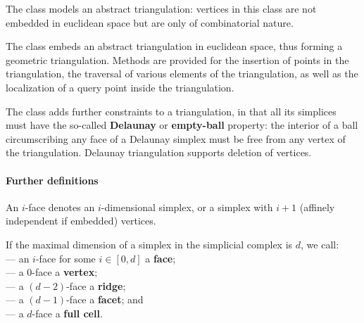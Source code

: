 {{The class  models an abstract triangulation: vertices in this
class are not embedded in euclidean space but are only of combinatorial
nature.

The class  embeds an abstract
triangulation in euclidean space, thus forming a geometric
triangulation. Methods are
provided for the insertion %
of points in the triangulation, the
traversal of various elements of the triangulation, as well as the localization of a
query point inside the triangulation.

The class  adds further
constraints to a triangulation, in that all its simplices must have the
so-called \textbf{Delaunay} or \textbf{empty-ball} property: the interior of
a ball circumscribing any face of a Delaunay simplex must be free from any
vertex of the triangulation. Delaunay triangulation supports deletion
of vertices.



\paragraph{Further definitions}

An $i$-face denotes an $i$-dimensional simplex, or a simplex
with $i+1$ (affinely independent if embedded) vertices.

If the maximal dimension of a simplex in the simplicial complex is
$d$, we call:\\
--- an $i$-face for some $i\in[0,d]$ a  \textbf{face};\\
--- a $0$-face a \textbf{vertex};\\
--- a $(d-2)$-face a \textbf{ridge};\\
--- a $(d-1)$-face a \textbf{facet}; and\\
--- a $d$-face  a \textbf{full cell}.

}}
